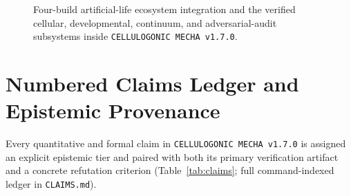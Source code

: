 \documentclass[11pt,reqno]{amsart}
\theoremstyle{plain}
\theoremstyle{definition}
\theoremstyle{remark}
\newcommand{\code}[1]{{\footnotesize\nolinkurl{#1}}}
\begin{document}
\begin{figure}[ht]
{%
}
\caption{Four-build artificial-life ecosystem integration and the verified cellular, developmental, continuum, and adversarial-audit subsystems inside \texttt{CELLULOGONIC MECHA v1.7.0}.}
\label{fig:arch}
\end{figure}

\section{Numbered Claims Ledger and Epistemic Provenance}
\label{sec:claims}

Every quantitative and formal claim in \texttt{CELLULOGONIC MECHA v1.7.0} is assigned an explicit epistemic tier and paired with both its primary verification artifact and a concrete refutation criterion (Table~\ref{tab:claims}; full command-indexed ledger in \code{CLAIMS.md}).
\end{document}
